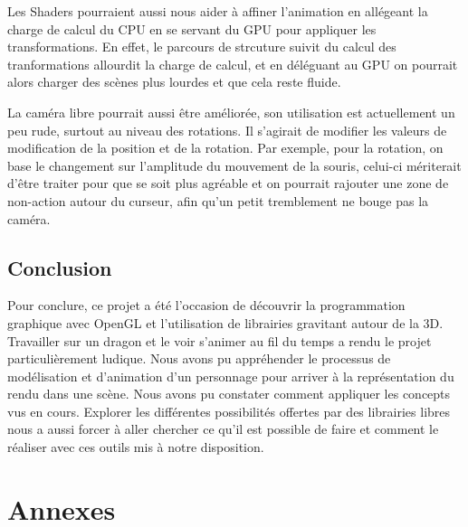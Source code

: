 \documentclass[a4paper]{report}
\begin{document}
Les Shaders pourraient aussi nous aider à affiner l'animation en allégeant la charge de calcul du CPU en se servant du GPU pour appliquer les transformations. En effet, le parcours de strcuture suivit du calcul des tranformations allourdit la charge de calcul, et en déléguant au GPU on pourrait alors charger des scènes plus lourdes et que cela reste fluide. 

La caméra libre pourrait aussi être améliorée, son utilisation est actuellement un peu rude, surtout au niveau des rotations. Il s'agirait de modifier les valeurs de modification de la position et de la rotation. Par exemple, pour la rotation, on base le changement sur l'amplitude du mouvement de la souris, celui-ci mériterait d'être traiter pour que se soit plus agréable et on pourrait rajouter une zone de non-action autour du curseur, afin qu'un petit tremblement ne bouge pas la caméra.

\section{Conclusion}
\par
Pour conclure, ce projet a été l'occasion de découvrir la programmation graphique avec OpenGL et l'utilisation de librairies gravitant autour de la 3D. Travailler sur un dragon et le voir s'animer au fil du temps a rendu le projet particulièrement ludique.
Nous avons pu appréhender le processus de modélisation et d'animation d'un personnage pour arriver à la représentation du rendu dans une scène. Nous avons pu constater comment appliquer les concepts vus en cours. Explorer les différentes possibilités offertes par des librairies libres nous a aussi forcer à aller chercher ce qu'il est possible de faire et comment le réaliser avec ces outils mis à notre disposition.


\newpage
\chapter{Annexes}
\end{document}
